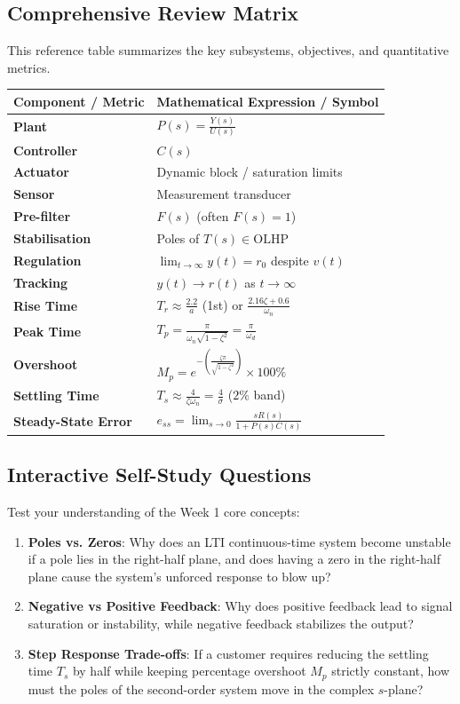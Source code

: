 \documentclass[12pt,onecolumn,twoside ]{article}
\begin{document}
	\subsection{Comprehensive Review Matrix}
	This reference table summarizes the key subsystems, objectives, and quantitative metrics.
	\begin{center}\small\begin{tabularx}{\textwidth}{*{2}{Y}}
			\toprule
			\textbf{Component / Metric} & \textbf{Mathematical Expression / Symbol} \\
			\midrule
			\textbf{Plant} & $P(s) = \frac{Y(s)}{U(s)}$ \\
			\textbf{Controller} & $C(s)$ \\
			\textbf{Actuator} & Dynamic block / saturation limits \\
			\textbf{Sensor} & Measurement transducer \\
			\textbf{Pre-filter} & $F(s)$ (often $F(s)=1$) \\
			\textbf{Stabilisation} & Poles of $T(s) \in \text{OLHP}$ \\
			\textbf{Regulation} & $\lim_{t \to \infty} y(t) = r_0$ despite $v(t)$ \\
			\textbf{Tracking} & $y(t) \to r(t)$ as $t \to \infty$ \\
			\textbf{Rise Time} & $T_r \approx \frac{2.2}{a}$ (1st) or $\frac{2.16\zeta+0.6}{\omega_n}$ \\
			\textbf{Peak Time} & $T_p = \frac{\pi}{\omega_n \sqrt{1 - \zeta^2}} = \frac{\pi}{\omega_d}$ \\
			\textbf{Overshoot} & $M_p = e^{-(\frac{\zeta \pi}{\sqrt{1-\zeta^2}})} \times 100\%$ \\
			\textbf{Settling Time} & $T_s \approx \frac{4}{\zeta \omega_n} = \frac{4}{\sigma}$ ($2\%$ band) \\
			\textbf{Steady-State Error} & $e_{ss} = \lim_{s \to 0} \frac{s R(s)}{1 + P(s)C(s)}$ \\
			\bottomrule
	\end{tabularx}\end{center}
	
	\subsection{Interactive Self-Study Questions}
	Test your understanding of the Week 1 core concepts:
	\begin{enumerate}
		\item
		\textbf{Poles vs. Zeros}: Why does an LTI continuous-time system become unstable if a pole lies in the right-half plane, and does having a zero in the right-half plane cause the system's unforced response to blow up?
		\item
		\textbf{Negative vs Positive Feedback}: Why does positive feedback lead to signal saturation or instability, while negative feedback stabilizes the output?
		\item
		\textbf{Step Response Trade-offs}: If a customer requires reducing the settling time $T_s$ by half while keeping percentage overshoot $M_p$ strictly constant, how must the poles of the second-order system move in the complex $s$-plane?
	\end{enumerate}
	
\end{document}
